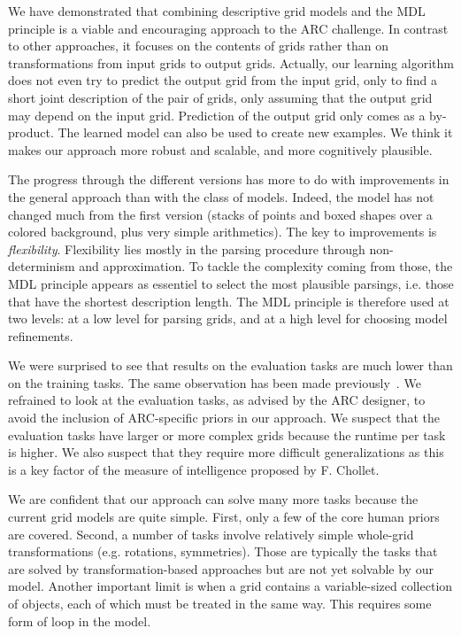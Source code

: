 \documentclass[a4paper]{llncs}
\begin{document}

We have demonstrated that combining descriptive grid models and the
MDL principle is a viable and encouraging approach to the ARC
challenge. In contrast to other approaches, it focuses on the contents
of grids rather than on transformations from input grids to output
grids. Actually, our learning algorithm does not even try to predict
the output grid from the input grid, only to find a short joint
description of the pair of grids, only assuming that the output grid
may depend on the input grid. Prediction of the output grid only comes
as a by-product. The learned model can also be used to create new
examples. We think it makes our approach more robust and scalable, and
more cognitively plausible.

The progress through the different versions has more to do with
improvements in the general approach than with the class of
models. Indeed, the model has not changed much from the first version
(stacks of points and boxed shapes over a colored background, plus
very simple arithmetics). The key to improvements is {\em
  flexibility}. Flexibility lies mostly in the parsing procedure
through non-determinism and approximation. To tackle the complexity
coming from those, the MDL principle appears as essentiel to select
the most plausible parsings, i.e. those that have the shortest
description length. The MDL principle is therefore used at two levels:
at a low level for parsing grids, and at a high level for choosing
model refinements.

We were surprised to see that results on the evaluation tasks are much
lower than on the training tasks. The same observation has been made
previously~\cite{Fischer2020}. We refrained to look at the evaluation
tasks, as advised by the ARC designer, to avoid the inclusion of
ARC-specific priors in our approach. We suspect that the evaluation
tasks have larger or more complex grids because the runtime per task
is higher. We also suspect that they require more difficult
generalizations as this is a key factor of the measure of intelligence
proposed by F. Chollet.

We are confident that our approach can solve many more tasks because
the current grid models are quite simple. First, only a few of the
core human priors are covered. Second, a number of tasks involve
relatively simple whole-grid transformations (e.g. rotations,
symmetries). Those are typically the tasks that are solved by
transformation-based approaches but are not yet solvable by our
model. Another important limit is when a grid contains a
variable-sized collection of objects, each of which must be treated in
the same way. This requires some form of loop in the model.
\end{document}
